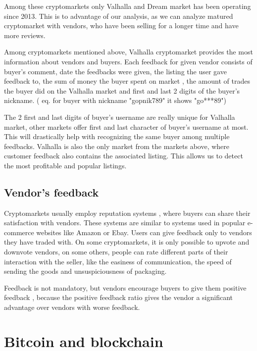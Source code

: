 \documentclass[
  digital, %
  table,   %
  lof,     %
  lot,     %
  oneside
]{fithesis3}
\begin{document}
Among these cryptomarkets only Valhalla and Dream market has been operating since 2013.
This is to advantage of our analysis, as we can analyze matured cryptomarket with vendors,
who have been selling for a longer time and have more reviews.

Among cryptomarkets mentioned above,
Valhalla cryptomarket provides the most information about vendors and buyers.
Each feedback for given vendor consists of 
buyer's comment, date the feedbacks were given, the listing the user gave feedback to, the sum of money the buyer spent on market
, the amount of trades the buyer did on the Valhalla market and
first and last 2 digits of the buyer's nickname. 
( eq. for buyer with nickname "gopnik789" it shows "go***89")

The 2 first and last digits of buyer's username are really unique for Valhalla market,
other markets offer first and last character of buyer's username at most.
This will drastically help with recognizing the same buyer among multiple feedbacks.
Valhalla is also the only market from the markets above, where customer feedback also contains the
associated listing.
This allows us to detect the most profitable and popular listings.

\subsection{Vendor's feedback}

Cryptomarkets usually employ reputation systems \parencite{resnick2000reputation},
where buyers can share their satisfaction with vendors.
These systems are similar to systems used in popular e-commerce websites like Amazon or Ebay.
Users can give feedback only to vendors they have traded with.
On some cryptomarkets, it is only possible to upvote and downvote vendors,
on some others, people can rate different parts of their interaction with the seller,
like the easiness of communication,
the speed of sending the goods and unsuspiciousness of packaging.

Feedback is not mandatory, but vendors encourage buyers to give them positive feedback
\parencite{aldridge2014not}\parencite{soska2015measuring}, because the positive feedback
ratio gives the vendor a significant advantage over vendors with worse feedback.

\section{Bitcoin and blockchain}
\end{document}
